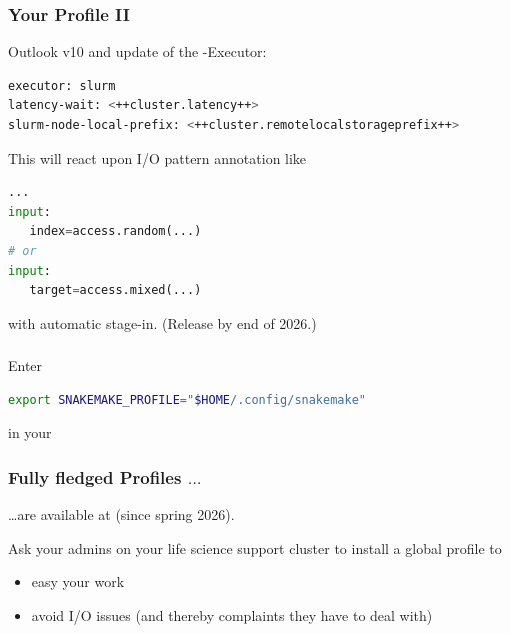\begin{frame}[fragile]
    \frametitle{Your Profile II}
    Outlook \Snakemake v10 and update of the \SLURM-Executor:
    \begin{lstlisting}[language=Bash, style=Shell]
executor: slurm
latency-wait: <++cluster.latency++>
slurm-node-local-prefix: <++cluster.remotelocalstorageprefix++>
    \end{lstlisting}
    This will react upon I/O pattern annotation like
    \begin{lstlisting}[language=Python,style=Python]
...
input:
   index=access.random(...)
# or
input:
   target=access.mixed(...)
    \end{lstlisting}
    with automatic stage-in. (Release by end of 2026.)
\end{frame}


\begin{frame}[fragile]
	\frametitle{}
	Enter 
	\begin{lstlisting}[language=Bash, style=Shell]
export SNAKEMAKE_PROFILE="$HOME/.config/snakemake"
    \end{lstlisting}
	in your 
\end{frame}

\begin{frame}
   \frametitle{Fully fledged Profiles $\ldots$}
   \ldots are available at  (since spring 2026).
   \pause
   \begin{hint}
       Ask your admins on your life science support cluster to install a global profile to
       \begin{itemize}
           \item easy your work
           \item avoid I/O issues (and thereby complaints they have to deal with)
       \end{itemize}
   \end{hint}
\end{frame}

